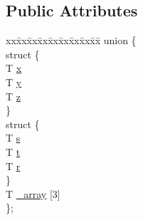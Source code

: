 \subsection*{Public Attributes}
\begin{CompactItemize}
\item 
\begin{tabbing}
xx\=xx\=xx\=xx\=xx\=xx\=xx\=xx\=xx\=\kill
union \{\\
\>struct \{\\
\>\>T \hyperlink{classnv_1_1vec3_6a5c82f6f2eda9b003522b1eb049d8e5}{x}\\
\>\>T \hyperlink{classnv_1_1vec3_74dbe5f66d5a3201625444b5f0d7d290}{y}\\
\>\>T \hyperlink{classnv_1_1vec3_b8b7f9954c952e359ded3238ab618dae}{z}\\
\>\} \\
\>struct \{\\
\>\>T \hyperlink{classnv_1_1vec3_a8acdad61c300d347acc1e6cc0f6a2ba}{s}\\
\>\>T \hyperlink{classnv_1_1vec3_627872f6520734193bb67a93c2b4c77a}{t}\\
\>\>T \hyperlink{classnv_1_1vec3_806f03c9db7ec5435c1ba227be78e39e}{r}\\
\>\} \\
\>T \hyperlink{classnv_1_1vec3_526c6e0da95f6c87cd95bd28c40ee457}{\_array} \mbox{[}3\mbox{]}\\
\}; \\

\end{tabbing}\end{CompactItemize}
